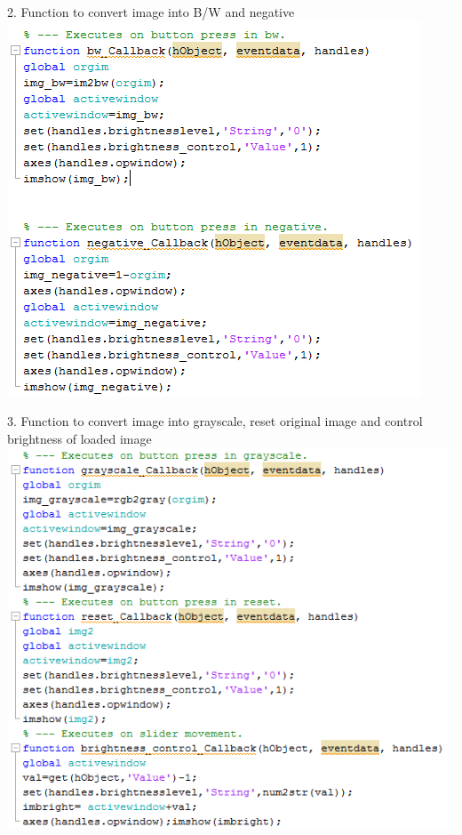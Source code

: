 \documentclass[12pt]{article}
\begin{document}
2. Function to convert image into B/W and negative\\


\includegraphics[scale=0.8 ]{3CODETHREE.png}

3. Function to convert image into grayscale, reset original image and control brightness of loaded image \\

\includegraphics[scale=1.0 ]{3CODEFOUR.png}


\pagebreak
\end{document}
